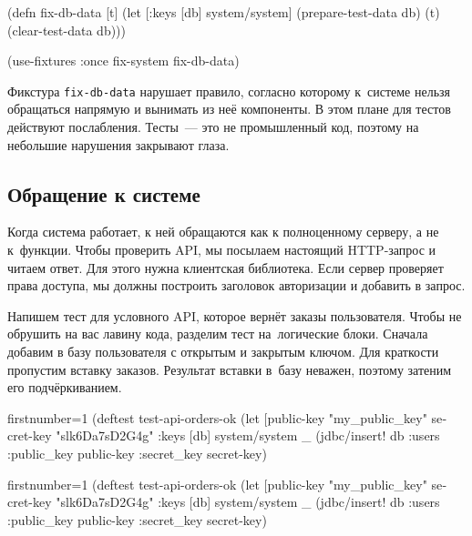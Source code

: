 \else

\begin{english}
  \begin{clojure}
(defn fix-db-data
  [t]
  (let [{:keys [db]} system/system]
    (prepare-test-data db)
    (t)
    (clear-test-data db)))

(use-fixtures :once fix-system fix-db-data)
  \end{clojure}
\end{english}

\fi

Фикстура \verb|fix-db-data| нарушает правило, согласно которому к~системе нельзя
обращаться напрямую и вынимать из неё компоненты. В этом плане для тестов
действуют послабления. Тесты~--- это не промышленный код, поэтому на небольшие
нарушения закрывают глаза.

\subsection{Обращение к системе}

Когда система работает, к ней обращаются как к полноценному серверу, а не к~функции.
Чтобы проверить API, мы посылаем настоящий HTTP-запрос и читаем
ответ. Для этого нужна клиентская библиотека. Если сервер проверяет права
доступа, мы должны построить заголовок авторизации и добавить в запрос.

Напишем тест для условного API, которое вернёт заказы пользователя. Чтобы не
обрушить на вас лавину кода, разделим тест на~логические блоки. Сначала добавим
в базу пользователя с открытым и закрытым ключом. Для краткости пропустим
вставку заказов. Результат вставки в~базу неважен, поэтому затеним его
подчёркиванием.

\ifx\DEVICETYPE\MOBILE

\begin{english}
  \begin{clojure/lines*}{firstnumber=1}
(deftest test-api-orders-ok
  (let [public-key "my_public_key"
        secret-key "slk6Da7sD2G4g"
        {:keys [db]} system/system
        _ (jdbc/insert! db :users
            {:public_key public-key
             :secret_key secret-key})
  \end{clojure/lines*}
\end{english}

\else

\begin{english}
  \begin{clojure/lines*}{firstnumber=1}
(deftest test-api-orders-ok
  (let [public-key "my_public_key"
        secret-key "slk6Da7sD2G4g"
        {:keys [db]} system/system
        _ (jdbc/insert! db :users {:public_key public-key
                                   :secret_key secret-key})
  \end{clojure/lines*}
\end{english}

